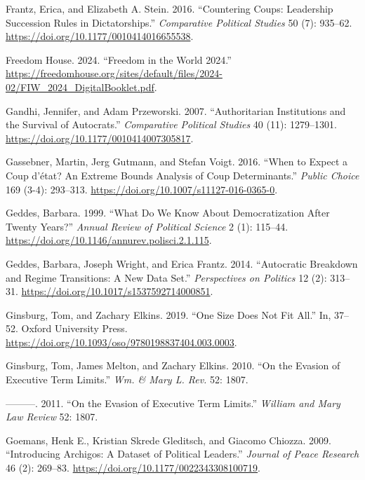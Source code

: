 \documentclass[
  12pt,
]{report}
\newlength{\cslhangindent}
\newenvironment{CSLReferences}[2] %
 {\begin{list}{}{%
  \setlength{\itemindent}{0pt}
  \setlength{\leftmargin}{0pt}
  \setlength{\parsep}{0pt}
  \ifodd #1
   \setlength{\leftmargin}{\cslhangindent}
   \setlength{\itemindent}{-1\cslhangindent}
  \fi
  \setlength{\itemsep}{#2\baselineskip}}}
 {\end{list}}
\begin{document}
\begin{CSLReferences}{1}{0}
Frantz, Erica, and Elizabeth A. Stein. 2016. {``Countering Coups:
Leadership Succession Rules in Dictatorships.''} \emph{Comparative
Political Studies} 50 (7): 935--62.
\url{https://doi.org/10.1177/0010414016655538}.

Freedom House. 2024. {``Freedom in the World 2024.''}
\url{https://freedomhouse.org/sites/default/files/2024-02/FIW_2024_DigitalBooklet.pdf}.

Gandhi, Jennifer, and Adam Przeworski. 2007. {``Authoritarian
Institutions and the Survival of Autocrats.''} \emph{Comparative
Political Studies} 40 (11): 1279--1301.
\url{https://doi.org/10.1177/0010414007305817}.

Gassebner, Martin, Jerg Gutmann, and Stefan Voigt. 2016. {``When to
Expect a Coup d{'}état? An Extreme Bounds Analysis of Coup
Determinants.''} \emph{Public Choice} 169 (3-4): 293--313.
\url{https://doi.org/10.1007/s11127-016-0365-0}.

Geddes, Barbara. 1999. {``What Do We Know About Democratization After
Twenty Years?''} \emph{Annual Review of Political Science} 2 (1):
115--44. \url{https://doi.org/10.1146/annurev.polisci.2.1.115}.

Geddes, Barbara, Joseph Wright, and Erica Frantz. 2014. {``Autocratic
Breakdown and Regime Transitions: A New Data Set.''} \emph{Perspectives
on Politics} 12 (2): 313--31.
\url{https://doi.org/10.1017/s1537592714000851}.

Ginsburg, Tom, and Zachary Elkins. 2019. {``One Size Does Not Fit
All.''} In, 37--52. Oxford University Press.
\url{https://doi.org/10.1093/oso/9780198837404.003.0003}.

Ginsburg, Tom, James Melton, and Zachary Elkins. 2010. {``On the Evasion
of Executive Term Limits.''} \emph{Wm. \& Mary L. Rev.} 52: 1807.

---------. 2011. {``On the Evasion of Executive Term Limits.''}
\emph{William and Mary Law Review} 52: 1807.

Goemans, Henk E., Kristian Skrede Gleditsch, and Giacomo Chiozza. 2009.
{``Introducing Archigos: A Dataset of Political Leaders.''}
\emph{Journal of Peace Research} 46 (2): 269--83.
\url{https://doi.org/10.1177/0022343308100719}.


\end{CSLReferences}
\end{document}
